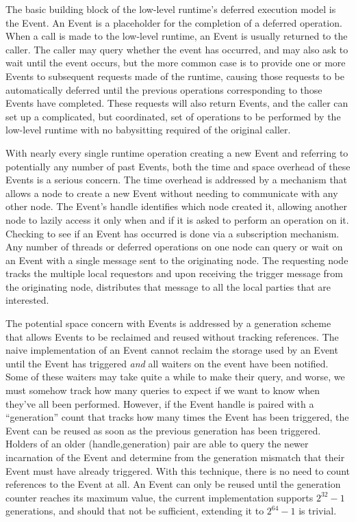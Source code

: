 The basic building block of the low-level runtime's deferred execution model
is the Event.  An Event is a placeholder for the completion of a deferred
operation.  When a call is made to the low-level runtime, an Event is usually
returned to the caller.  The caller may query whether the event has occurred,
and may also ask to wait until the event occurs, but the more common case is
to provide one or more Events to subsequent requests made of the runtime, 
causing those requests to be automatically deferred until the previous
operations corresponding to those Events have completed.  These requests will
also return Events, and the caller can set up a complicated, but coordinated,
set of operations to be performed by the low-level runtime with no babysitting
required of the original caller.

With nearly every single runtime operation creating a new Event and referring
to potentially any number of past Events, both the time and space overhead of
these Events is a serious concern.  The time overhead is addressed by a
mechanism that allows a node to create a new Event without needing to
communicate with any other node.  The Event's handle identifies which node
created it, allowing another node to lazily access it only when and if it 
is asked to perform an operation on it.  Checking to see if an Event has
occurred is done via a subscription mechanism.  Any number of threads or
deferred operations on one node can query or wait on an Event with a single
message sent to the originating node.  The requesting node tracks the multiple
local requestors and upon receiving the trigger message from the originating
node, distributes that message to all the local parties that are interested.

The potential space concern with Events is addressed by a generation scheme
that allows Events to be reclaimed and reused without tracking references.  The
naive implementation of an Event cannot reclaim the storage used by an Event
until the Event has triggered \emph{and} all waiters on the event have been
notified.  Some of these waiters may take quite a while to make their query,
and worse, we must somehow track how many queries to expect if we want to know
when they've all been performed.  However, if the Event handle is paired with a
``generation'' count that tracks how many times the Event has been triggered,
the Event can be reused as soon as the previous generation has been triggered.
Holders of an older (handle,generation) pair are able to query the newer
incarnation of the Event and determine from the generation mismatch that their
Event must have already triggered.  With this technique, there is no need to
count references to the Event at all.  An Event can only be reused until the
generation counter reaches its maximum value, the current implementation
supports $2^{32}-1$ generations, and should that not be sufficient, extending
it to $2^{64}-1$ is trivial.


